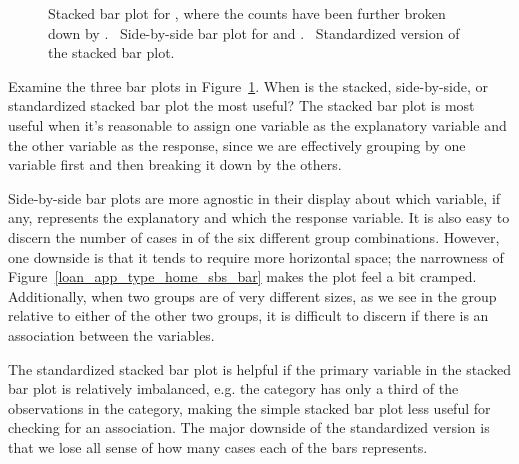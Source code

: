 \begin{figure}[h]
  \caption{ Stacked
      bar plot for ,
      where the counts have been further broken down
      by .
      ~Side-by-side
      bar plot for 
      and .
      ~Standardized
      version of the stacked bar plot.}
  \label{loan_app_type_home_seg_bar_plot}
\end{figure}

\begin{examplewrap}
\begin{nexample}{Examine the three bar plots in
    Figure~\ref{loan_app_type_home_seg_bar_plot}.
    When is the stacked, side-by-side, or standardized
    stacked bar plot the most useful?}
  The stacked bar plot is most useful when it's reasonable
  to assign one variable as the explanatory variable and
  the other variable as the response, since we are effectively
  grouping by one variable first and then breaking it down by
  the others.

  Side-by-side bar plots are more agnostic in their display
  about which variable, if any, represents the explanatory
  and which the response variable.
  It is also easy to discern the number of cases
  in of the six different group combinations.
  However, one downside
  is that it tends to require more horizontal space;
  the narrowness of Figure~\ref{loan_app_type_home_sbs_bar}
  makes the plot feel a bit cramped.
  Additionally, when two groups are of very different sizes,
  as we see in the  group relative to either of the
  other two groups,
  it is difficult to discern if there is an association
  between the variables.

  The standardized stacked bar plot is helpful if the primary
  variable in the stacked bar plot is relatively imbalanced,
  e.g. the  category has only a third of the
  observations in the  category,
  making the simple stacked bar plot less useful for
  checking for an association.
  The major downside of the standardized version
  is that we lose all sense of how many cases each of the
  bars represents.
\end{nexample}
\end{examplewrap}

